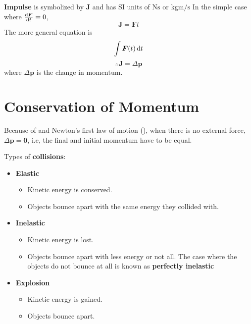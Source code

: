 \documentclass[a4paper, titlepage]{book}
\begin{document}
\textbf{Impulse} is symbolized by \(\bm{J}\)
and has SI units of \(\unit{\newton \second}\) or \(\unit{\kilogram \metre \per \second}\)
In the simple case where \(\odv{\bm{F}}{t} = 0\),
\begin{equation}
    \bm{J} = \bm{F} t
\end{equation}
The more general equation is
\begin{equation}
    \int \bm{F}(t) \odif{t}
\end{equation}
\begin{equation}
    \therefore \bm{J} = \Delta{\bm{p}}
\end{equation}
where \(\Delta{\bm{p}}\) is the change in momentum.

\section{Conservation of Momentum}

Because of  and Newton's first law of motion
(),
when there is no external force, \(\Delta{\bm{p}} = \bm{0}\),
i.e, the final and initial momentum have to be equal.

Types of \textbf{collisions}:
\begin{itemize}
    \item
        \textbf{Elastic}
        \begin{itemize}
            \item Kinetic energy is conserved.
            \item Objects bounce apart with the same energy they collided with.
        \end{itemize}
    \item
        \textbf{Inelastic}
        \begin{itemize}
            \item Kinetic energy is lost.
            \item Objects bounce apart with less energy or not all.
                  The case where the objects do not bounce at all
                  is known as \textbf{perfectly inelastic}
        \end{itemize}
    \item
        \textbf{Explosion}
        \begin{itemize}
            \item Kinetic energy is gained.
            \item Objects bounce apart.
        \end{itemize}
\end{itemize}
\end{document}
